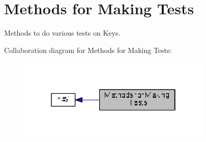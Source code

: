 \hypertarget{group__keytest}{\section{Methods for Making Tests}
\label{group__keytest}
}


Methods to do various tests on Keys.  


Collaboration diagram for Methods for Making Tests\+:
\nopagebreak
\begin{figure}[H]
\begin{center}
\leavevmode
\includegraphics[width=262pt]{group__keytest}
\end{center}
\end{figure}
